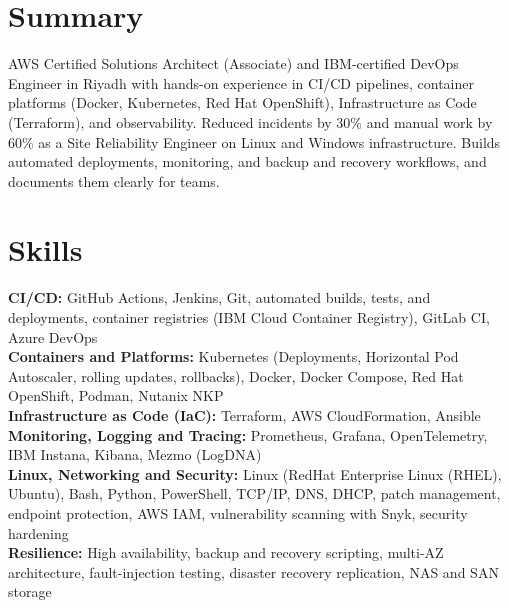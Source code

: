 \documentclass[a4paper,10pt]{article}
\begin{document}

\section*{Summary}
AWS Certified Solutions Architect (Associate) and IBM-certified DevOps Engineer in Riyadh with hands-on experience in CI/CD pipelines, container platforms (Docker, Kubernetes, Red Hat OpenShift), Infrastructure as Code (Terraform), and observability. Reduced incidents by 30\% and manual work by 60\% as a Site Reliability Engineer on Linux and Windows infrastructure. Builds automated deployments, monitoring, and backup and recovery workflows, and documents them clearly for teams.

\section*{Skills}
\textbf{CI/CD:} GitHub Actions, Jenkins, Git, automated builds, tests, and deployments, container registries (IBM Cloud Container Registry), GitLab CI, Azure DevOps \\
\textbf{Containers and Platforms:} Kubernetes (Deployments, Horizontal Pod Autoscaler, rolling updates, rollbacks), Docker, Docker Compose, Red Hat OpenShift, Podman, Nutanix NKP \\
\textbf{Infrastructure as Code (IaC):} Terraform, AWS CloudFormation, Ansible \\
\textbf{Monitoring, Logging and Tracing:} Prometheus, Grafana, OpenTelemetry, IBM Instana, Kibana, Mezmo (LogDNA)\\
\textbf{Linux, Networking and Security:} Linux (RedHat Enterprise Linux (RHEL), Ubuntu), Bash, Python, PowerShell, TCP/IP, DNS, DHCP, patch management, endpoint protection, AWS IAM, vulnerability scanning with Snyk, security hardening \\
\textbf{Resilience:} High availability, backup and recovery scripting, multi-AZ architecture, fault-injection testing, disaster recovery replication, NAS and SAN storage
\end{document}
